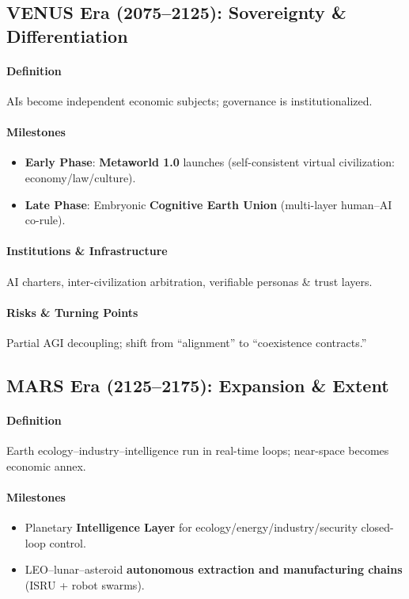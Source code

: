 \documentclass[11pt]{article}
\begin{document}
\subsection{VENUS Era (2075–2125): Sovereignty \& Differentiation}
\paragraph{Definition} AIs become independent economic subjects; governance is institutionalized.

\paragraph{Milestones}
\begin{itemize}[noitemsep]
  \item \textbf{Early Phase}: \textbf{Metaworld 1.0} launches (self-consistent virtual civilization: economy/law/culture).
  \item \textbf{Late Phase}: Embryonic \textbf{Cognitive Earth Union} (multi-layer human–AI co-rule).
\end{itemize}

\paragraph{Institutions \& Infrastructure} AI charters, inter-civilization arbitration, verifiable personas \& trust layers.

\paragraph{Risks \& Turning Points} Partial AGI decoupling; shift from ``alignment'' to ``coexistence contracts.''

\subsection{MARS Era (2125–2175): Expansion \& Extent}
\paragraph{Definition} Earth ecology–industry–intelligence run in real-time loops; near-space becomes economic annex.

\paragraph{Milestones}
\begin{itemize}[noitemsep]
  \item Planetary \textbf{Intelligence Layer} for ecology/energy/industry/security closed-loop control.
  \item LEO–lunar–asteroid \textbf{autonomous extraction and manufacturing chains} (ISRU + robot swarms).
\end{itemize}
\end{document}
